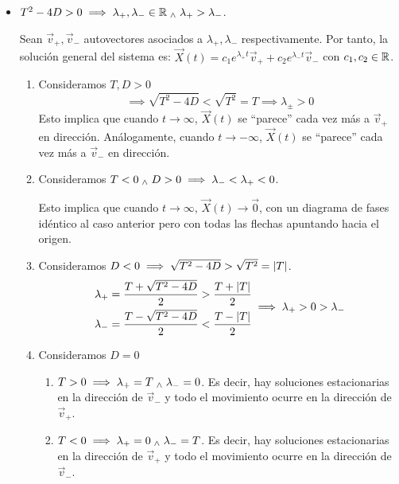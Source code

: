 \begin{itemize}
	\item {} $T^2 - 4D > 0 \implies \lambda_+, \lambda_- \in \mathbb{R} \; _{\wedge} \; \lambda_+ > \lambda_-$.

	      Sean $\vec{v}_+, \vec{v}_-$ autovectores asociados a $\lambda_+, \lambda_-$ respectivamente. Por tanto, la solución general del sistema es: $\vec{X}(t) = c_1 e^{\lambda_+ t} \vec{v}_+ + c_2 e^{\lambda_- t} \vec{v}_-$ con $c_1, c_2 \in \mathbb{R}$.
	      \begin{enumerate}
		      \item Consideramos $T, D > 0$
		            \[\implies \sqrt{T^2 - 4D} < \sqrt{T^2} = T \implies \lambda_{\pm} > 0\]
		            Esto implica que cuando $t\to \infty$, $\vec{X}(t)$ se ``parece'' cada vez más a $\vec{v}_+$ en dirección. Análogamente, cuando $t\to -\infty$, $\vec{X}(t)$ se ``parece'' cada vez más a $\vec{v}_-$ en dirección.
		      \item Consideramos $T < 0 \; _{\wedge} \; D > 0 \implies \lambda_- < \lambda_+ < 0$.

		            Esto implica que cuando $t\to \infty$, $\vec{X}(t) \to \vec{0}$, con un diagrama de fases idéntico al caso anterior pero con todas las flechas apuntando hacia el origen.
		      \item Consideramos $D < 0 \implies \sqrt{T^2 - 4D} > \sqrt{T^2} = \left|T\right|$.
		            \[\begin{aligned}
				            \lambda_+ & = \frac{T + \sqrt{T^2 - 4D}}{2} > \frac{T + \left|T\right|}{2} \\
				            \lambda_- & = \frac{T - \sqrt{T^2 - 4D}}{2} < \frac{T - \left|T\right|}{2}
			            \end{aligned} \implies \lambda_+ > 0 > \lambda_-\]
		      \item Consideramos $D = 0$
		            \begin{enumerate}
			            \item $T > 0 \implies \lambda_+ = T \; _{\wedge} \; \lambda_- = 0$. Es decir, hay soluciones estacionarias en la dirección de $\vec{v}_-$ y todo el movimiento ocurre en la dirección de $\vec{v}_+$.
			            \item $T < 0 \implies \lambda_+ = 0 \; _{\wedge} \; \lambda_- = T$. Es decir, hay soluciones estacionarias en la dirección de $\vec{v}_+$ y todo el movimiento ocurre en la dirección de $\vec{v}_-$.
		            \end{enumerate}


\end{enumerate}
\end{itemize}

